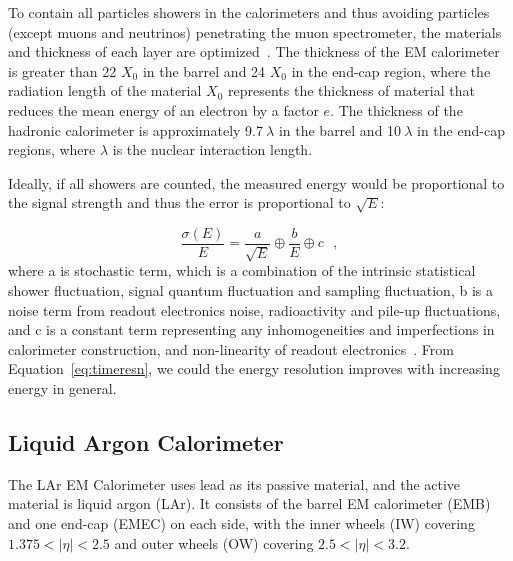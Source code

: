 \par To contain all particles showers in the calorimeters and thus avoiding particles (except muons and neutrinos) penetrating the muon spectrometer, the materials and thickness of each layer are optimized~\cite{Aad:1129811}. The thickness of the EM calorimeter is greater than 22 $X_0$ in the barrel and 24 $X_0$ in the end-cap region, where the radiation length of the material $X_0$ represents the thickness of material that reduces the mean energy of an electron by a factor $e$. The thickness of the hadronic calorimeter is approximately 9.7$~\lambda$ in the barrel and 10$~\lambda$ in the end-cap regions, where $\lambda$ is the nuclear interaction length.

\par Ideally, if all showers are counted, the measured energy would be proportional to the signal strength and thus the error is proportional to $\sqrt{E}$:

\begin{equation}
\label{eq:timeresn}
\frac{\sigma(E)}{E} = \frac{a}{\sqrt{E}} \oplus \frac{b}{E} \oplus c \ \ \  ,
\end{equation}
where a is stochastic term, which is a combination of the intrinsic statistical shower fluctuation, signal quantum fluctuation and sampling fluctuation, b is a noise term from readout electronics noise, radioactivity and pile-up fluctuations, and c is a constant term representing any inhomogeneities and imperfections in calorimeter construction, and non-linearity of readout electronics~\cite{calorimetry}. From Equation~\ref{eq:timeresn}, we could the energy resolution improves with increasing energy in general.

\subsection{Liquid Argon Calorimeter}

\par The LAr EM Calorimeter uses lead as its passive material, and the active material is liquid argon (LAr). 
It consists of the barrel EM calorimeter (EMB) and one end-cap (EMEC) on each side, with the inner wheels (IW) covering $1.375 < |\eta| < 2.5$ and outer wheels (OW) covering $2.5 < |\eta| < 3.2$.


